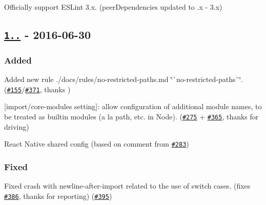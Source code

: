 \begin{DoxyItemize}
\item Officially support E\+S\+Lint 3.\+x. (peer\+Dependencies updated to {.\+x -\/ 3.\+x})
\end{DoxyItemize}

\subsection*{\href{https://github.com/benmosher/eslint-plugin-import/compare/v1.9.2...v1.10.0}{\tt 1..} -\/ 2016-\/06-\/30}

\subsubsection*{Added}


\begin{DoxyItemize}
\item Added new rule ./docs/rules/no-\/restricted-\/paths.md \char`\"{}\`{}no-\/restricted-\/paths\`{}\char`\"{}. (\href{https://github.com/benmosher/eslint-plugin-import/issues/155}{\tt \#155}/\href{https://github.com/benmosher/eslint-plugin-import/pull/371}{\tt \#371}, thanks \href{https://github.com/lo1tuma}{\tt })
\item \mbox{[}{\ttfamily import/core-\/modules} setting\mbox{]}\+: allow configuration of additional module names, to be treated as builtin modules (a la {\ttfamily path}, etc. in Node). (\href{https://github.com/benmosher/eslint-plugin-import/issues/275}{\tt \#275} + \href{https://github.com/benmosher/eslint-plugin-import/pull/365}{\tt \#365}, thanks \href{https://github.com/sindresorhus}{\tt } for driving)
\item React Native shared config (based on comment from \href{https://github.com/benmosher/eslint-plugin-import/issues/283}{\tt \#283})
\end{DoxyItemize}

\subsubsection*{Fixed}


\begin{DoxyItemize}
\item Fixed crash with {\ttfamily newline-\/after-\/import} related to the use of switch cases. (fixes \href{https://github.com/benmosher/eslint-plugin-import/issues/386}{\tt \#386}, thanks \href{https://github.com/ljharb}{\tt } for reporting) (\href{https://github.com/benmosher/eslint-plugin-import/pull/395}{\tt \#395})
\end{DoxyItemize}

